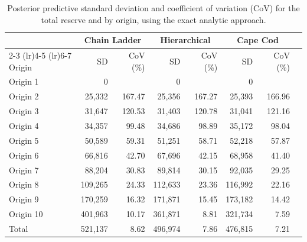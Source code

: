 \begin{table}[htbp]
\centering
\begin{tabular}{lrrrrrrr}
\toprule
 & \multicolumn{2}{c}{Chain Ladder} & \multicolumn{2}{c}{Hierarchical} & \multicolumn{2}{c}{Cape Cod} \\
\cmidrule(lr){2-3} \cmidrule(lr){4-5} \cmidrule(lr){6-7}
Origin & SD & CoV (\%) & SD & CoV (\%) & SD & CoV (\%) \\
\midrule
Origin 1 & 0 &  & 0 &  & 0 &  \\
Origin 2 & 25,332 & 167.47 & 25,356 & 167.27 & 25,393 & 166.96 \\
Origin 3 & 31,647 & 120.53 & 31,403 & 120.78 & 31,041 & 121.16 \\
Origin 4 & 34,357 & 99.48 & 34,686 & 98.89 & 35,172 & 98.04 \\
Origin 5 & 50,589 & 59.31 & 51,251 & 58.71 & 52,218 & 57.87 \\
Origin 6 & 66,816 & 42.70 & 67,696 & 42.15 & 68,958 & 41.40 \\
Origin 7 & 88,204 & 30.83 & 89,814 & 30.15 & 92,035 & 29.25 \\
Origin 8 & 109,265 & 24.33 & 112,633 & 23.36 & 116,992 & 22.16 \\
Origin 9 & 170,259 & 16.32 & 171,871 & 15.45 & 173,182 & 14.42 \\
Origin 10 & 401,963 & 10.17 & 361,871 & 8.81 & 321,734 & 7.59 \\
Total & 521,137 & 8.62 & 496,974 & 7.86 & 476,815 & 7.21 \\
\bottomrule
\end{tabular}
\caption{Posterior predictive standard deviation and coefficient of variation (CoV) for the total reserve and by origin, using the exact analytic approach.}
\label{tab:saluz_reserve_sd_analytic}
\end{table}